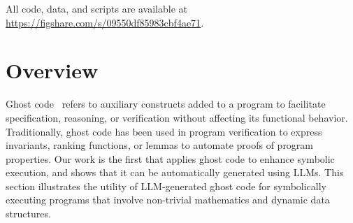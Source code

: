 \documentclass[acmsmall,screen,nonacm]{acmart}
\theoremstyle{definition}
\begin{document}
All code, data, and scripts are available at \url{https://figshare.com/s/09550df85983cbf4ae71}.

\section{Overview}

Ghost code~\cite{filliatre2016spirit} refers to auxiliary constructs added to a program to facilitate specification, reasoning, or verification without affecting its functional behavior. Traditionally, ghost code has been used in program verification to express invariants, ranking functions, or lemmas to automate proofs of program properties. Our work is the first that applies ghost code to enhance symbolic execution, and shows that it can be automatically generated using LLMs. This section illustrates the utility of LLM-generated ghost code for symbolically executing programs that involve non-trivial mathematics and dynamic data structures.
\end{document}

